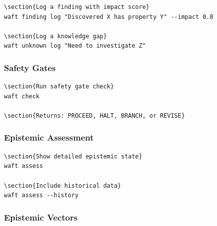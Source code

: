 \documentclass{article}
\begin{document}
\begin{itemize}
\begin{itemize}
\begin{itemize}
\begin{itemize}
\begin{itemize}
\begin{itemize}
\begin{itemize}
\begin{itemize}
\begin{itemize}
\begin{itemize}
\begin{verbatim}
\section{Log a finding with impact score}
waft finding log "Discovered X has property Y" --impact 0.8

\section{Log a knowledge gap}
waft unknown log "Need to investigate Z"

\end{verbatim}

\subsubsection{Safety Gates}

\begin{verbatim}
\section{Run safety gate check}
waft check

\section{Returns: PROCEED, HALT, BRANCH, or REVISE}

\end{verbatim}

\subsubsection{Epistemic Assessment}

\begin{verbatim}
\section{Show detailed epistemic state}
waft assess

\section{Include historical data}
waft assess --history

\end{verbatim}

\subsubsection{Epistemic Vectors}


\end{itemize}
\end{itemize}
\end{itemize}
\end{itemize}
\end{itemize}
\end{itemize}
\end{itemize}
\end{itemize}
\end{itemize}
\end{itemize}
\end{document}
